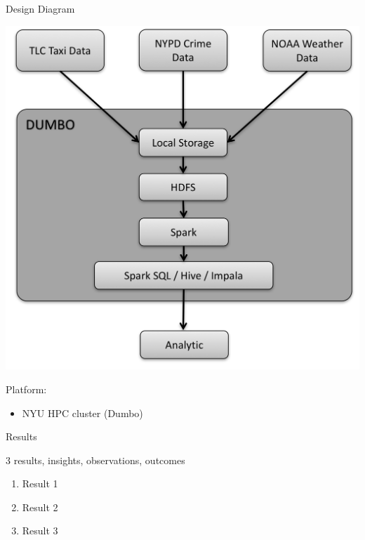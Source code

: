 \documentclass[10pt,ignorenonframetext,]{beamer}
\providecommand{\tightlist}{%
  \setlength{\itemsep}{0pt}\setlength{\parskip}{0pt}}
\begin{document}
\begin{frame}{Design Diagram}

\begin{center}
\includegraphics[height=.6\textheight]{img/DesignFlowDiagram.jpg}
\end{center}

\begin{block}{Platform:}

\begin{itemize}
\tightlist
\item
  NYU HPC cluster (Dumbo)
\end{itemize}

\end{block}

\end{frame}

\begin{frame}{Results}

3 results, insights, observations, outcomes

\begin{enumerate}
\def\labelenumi{\arabic{enumi}.}
\item
  Result 1
\item
  Result 2
\item
  Result 3
\end{enumerate}

\end{frame}
\end{document}
